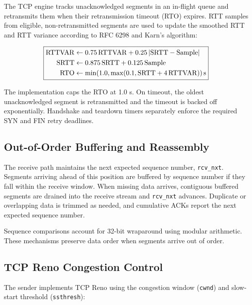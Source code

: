 \documentclass[12pt]{article}
\begin{document}
The TCP engine tracks unacknowledged segments in an in-flight queue and retransmits them when their retransmission timeout (RTO) expires. RTT samples from eligible, non-retransmitted segments are used to update the smoothed RTT and RTT variance according to RFC 6298 and Karn's algorithm:

\[
\fbox{\(
\begin{aligned}
\mathrm{RTTVAR} &\leftarrow 0.75\,\mathrm{RTTVAR}
+ 0.25\,|\mathrm{SRTT}-\mathrm{Sample}|\\
\mathrm{SRTT} &\leftarrow 0.875\,\mathrm{SRTT}
+ 0.125\,\mathrm{Sample}\\
\mathrm{RTO} &\leftarrow
\min(1.0,\max(0.1,\mathrm{SRTT}+4\,\mathrm{RTTVAR}))\,\mathrm{s}
\end{aligned}
\)}
\]

The implementation caps the RTO at 1.0 s. On timeout, the oldest unacknowledged segment is retransmitted and the timeout is backed off exponentially. Handshake and teardown timers separately enforce the required SYN and FIN retry deadlines.

\subsection{Out-of-Order Buffering and Reassembly}

The receive path maintains the next expected sequence number, \texttt{rcv\_nxt}. Segments arriving ahead of this position are buffered by sequence number if they fall within the receive window. When missing data arrives, contiguous buffered segments are drained into the receive stream and \texttt{rcv\_nxt} advances. Duplicate or overlapping data is trimmed as needed, and cumulative ACKs report the next expected sequence number.

Sequence comparisons account for 32-bit wraparound using modular arithmetic. These mechanisms preserve data order when segments arrive out of order.

\subsection{TCP Reno Congestion Control}

The sender implements TCP Reno using the congestion window (\texttt{cwnd}) and slow-start threshold (\texttt{ssthresh}):
\end{document}
